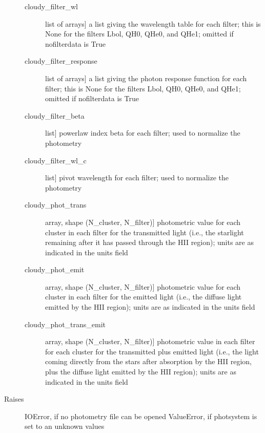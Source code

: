 \documentclass[letterpaper,10pt,english]{sphinxmanual}
\begin{document}
\begin{fulllineitems}
\begin{description}
\begin{description}
\item[{cloudy\_filter\_wl}] \leavevmode{[}list of arrays{]}
a list giving the wavelength table for each filter; this is
None for the filters Lbol, QH0, QHe0, and QHe1; omitted if
nofilterdata is True

\item[{cloudy\_filter\_response}] \leavevmode{[}list of arrays{]}
a list giving the photon response function for each filter;
this is None for the filters Lbol, QH0, QHe0, and QHe1; omitted
if nofilterdata is True

\item[{cloudy\_filter\_beta}] \leavevmode{[}list{]}
powerlaw index beta for each filter; used to normalize the
photometry

\item[{cloudy\_filter\_wl\_c}] \leavevmode{[}list{]}
pivot wavelength for each filter; used to normalize the photometry

\item[{cloudy\_phot\_trans}] \leavevmode{[}array, shape (N\_cluster, N\_filter){]}
photometric value for each cluster in each filter for the
transmitted light (i.e., the starlight remaining after it has
passed through the HII region); units are as indicated in
the units field

\item[{cloudy\_phot\_emit}] \leavevmode{[}array, shape (N\_cluster, N\_filter){]}
photometric value for each cluster in each filter for the
emitted light (i.e., the diffuse light emitted by the HII
region); units are as indicated in the units field

\item[{cloudy\_phot\_trans\_emit}] \leavevmode{[}array, shape (N\_cluster, N\_filter){]}
photometric value in each filter for each cluster for the
transmitted plus emitted light (i.e., the light coming
directly from the stars after absorption by the HII region,
plus the diffuse light emitted by the HII region); units are as
indicated in the units field

\end{description}

\item[{Raises}] \leavevmode
IOError, if no photometry file can be opened
ValueError, if photsystem is set to an unknown values

\end{description}

\end{fulllineitems}
\end{document}

